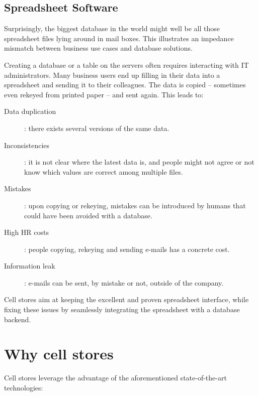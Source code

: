 \documentclass{vldb}
\begin{document}
\subsection{Spreadsheet Software}

Surprisingly, the biggest database in the world might well be all those spreadsheet files lying around in mail boxes. This illustrates an impedance mismatch between business use cases and database solutions.

Creating a database or a table on the servers often requires interacting with IT administrators. Many business users end up filling in their data into a spreadsheet and sending it to their colleagues. The data is copied -- sometimes even rekeyed from printed paper -- and sent again. This leads to:

\begin{description}
\item[Data duplication]: there exists several versions of the same data.
\item [Inconsistencies]: it is not clear where the latest data is, and people might not agree or not know which values are correct among multiple files.
\item[Mistakes]: upon copying or rekeying, mistakes can be introduced by humans that could have been avoided with a database.
\item[High HR costs]: people copying, rekeying and sending e-mails has a concrete cost.
\item[Information leak]: e-mails can be sent, by mistake or not, outside of the company.
\end{description}

Cell stores aim at keeping the excellent and proven spreadsheet interface, while fixing these issues by seamlessly integrating the spreadsheet with a database backend.

\section{Why cell stores}

Cell stores leverage the advantage of the aforementioned state-of-the-art technologies:
\end{document}
